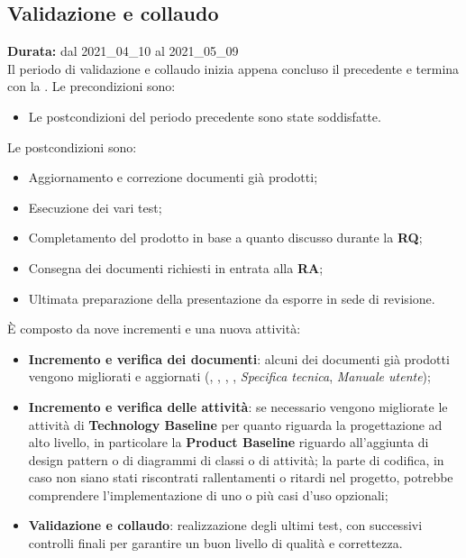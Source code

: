 \subsection{Validazione e collaudo}
\label{validazione_e_collaudo}
\textbf{Durata:} dal 2021\_04\_10 al 2021\_05\_09\\
Il periodo di validazione e collaudo inizia appena concluso il precedente e termina con la .
Le precondizioni sono:
\begin{itemize}
    \item Le postcondizioni del periodo precedente sono state soddisfatte.
\end{itemize}
Le postcondizioni sono:
\begin{itemize}
    \item Aggiornamento e correzione documenti già prodotti;
    \item Esecuzione dei vari test;
    \item Completamento del prodotto in base a quanto discusso durante la \textbf{RQ};
    \item Consegna dei documenti richiesti in entrata alla \textbf{RA};
    \item Ultimata preparazione della presentazione da esporre in sede di revisione.
\end{itemize}
È composto da nove incrementi e una nuova attività:
\begin{itemize}
    \item \textbf{Incremento e verifica dei documenti}: alcuni dei documenti già prodotti vengono migliorati e aggiornati ({\NdP}, {\PdP}, {\Glossario}, {\PdQ}, \textit{Specifica tecnica}, \textit{Manuale utente}); 
    \item \textbf{Incremento e verifica delle attività}: se necessario vengono migliorate le attività di \textbf{Technology Baseline} per quanto riguarda la progettazione ad alto livello, in particolare la \textbf{Product Baseline} riguardo all'aggiunta di design pattern o di diagrammi di classi o di attività; la parte di codifica, in caso non siano stati riscontrati rallentamenti o ritardi nel progetto, potrebbe comprendere l'implementazione di uno o più casi d'uso opzionali;
    \item \textbf{Validazione e collaudo}: realizzazione degli ultimi test, con successivi controlli finali per garantire un buon livello di qualità e correttezza.
\end{itemize}
\newpage
